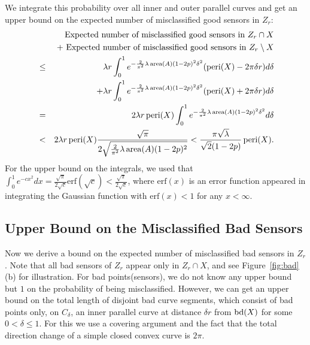 \documentclass{article}
\def\area{\mathop{\rm area}}
\def\bd{\mathop{\rm bd}}
\def\peri{\mathop{\rm peri}}
\begin{document}
\par
We integrate this probability over all inner and outer parallel curves and get an upper bound on the expected number of misclassified good sensors in $Z_r$:
\begin{eqnarray}
&\phantom{\leq}& \hbox{Expected number of misclassified good sensors in $Z_r \cap X$} \nonumber\\
&& + \hbox{ Expected number of misclassified good sensors in $Z_r \setminus X$} \nonumber\\
&\leq &\lambda r \int_{0}^1 e^{-{2\over\pi^2}\lambda\area(A)
(1-2p)^2\delta^2}(\peri(X)-2\pi\delta r) d\delta \nonumber\\
& & + \lambda r \int_{0}^1 e^{-{2\over\pi^2}\lambda\area(A) (1-2p)^2\delta^2} (\peri(X)+2\pi\delta r) d\delta \nonumber\\
&= & 2 \lambda r \peri(X) \int_{0}^1 e^{-{2\over\pi^2}\lambda\area(A)
(1-2p)^2\delta^2} d\delta \nonumber\\
& < &  2 \lambda r \peri(X) {\sqrt{\pi}\over2\sqrt{ {2\over\pi^2}\lambda\area(A)
(1-2p)^2}} <{\pi\sqrt{\lambda}\over \sqrt{2}(1-2p)} \peri(X). \label{eq:good}
\end{eqnarray}
For the upper bound on the integrals, we used that $\int_0^1 e^{-cx^2}dx= \frac{\sqrt{\pi}}{2\sqrt{c}}\mathrm{erf}(\sqrt{c}) < \frac{\sqrt{\pi}} {2\sqrt{c}}$, where $\mathrm{erf}(x)$ is an error function appeared in integrating the Gaussian function with $\mathrm{erf}(x) < 1$ for any $x < \infty$. 



\subsection{Upper Bound on the Misclassified Bad Sensors}
Now we derive a bound on the expected number of misclassified bad sensors in $Z_r$. Note that all bad sensors of $Z_r$ appear only in $Z_r\cap X$, and see Figure~\ref{fig:bad}(b) for illustration. For bad points(sensors), we do not know any upper bound but $1$ on the probability of being misclassified. However, we can get an upper bound on the total length of disjoint bad curve segments, which consist of bad points only, on $C_\delta$, an inner parallel curve at distance $\delta r$ from $\bd(X)$ for some $0 < \delta \le 1$.
For this we use a covering argument and the fact that the total direction change of a simple closed convex curve is $2\pi$.
\end{document}
